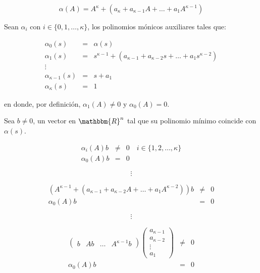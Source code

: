         \begin{equation}
            \alpha(A) = A^{\kappa} + (a_{\kappa} + a_{\kappa - 1} A + \dots + a_1 A^{\kappa - 1}) \nonumber
        \end{equation}

        Sean $\alpha_i$ con $i \in \{ 0, 1, \dots, \kappa \}$, los polinomios mónicos auxiliares tales que:

        \begin{eqnarray}
        \alpha_0(s) & = & \alpha(s) \nonumber \\
        \alpha_1(s) & = & s^{\kappa - 1} + (a_{\kappa - 1} + a_{\kappa - 2} s + \dots + a_1 s^{\kappa - 2}) \nonumber \\
        \vdots \nonumber \\
        \alpha_{\kappa - 1}(s) & = & s + a_1 \nonumber \\
        \alpha_{\kappa}(s) & = & 1 \nonumber
        \end{eqnarray}

        en donde, por definición, $\alpha_1(A) \ne 0$ y $\alpha_0(A) = 0$.

        Sea $b \ne 0$, un vector en $\mathbbm{R}^n$ tal que su polinomio mínimo coincide con $\alpha(s)$.

        \begin{eqnarray}
        \alpha_i(A) b & \ne & 0 \quad i \in \{ 1, 2, \dots, \kappa \} \nonumber \\
        \alpha_0(A) b & = & 0 \nonumber
        \end{eqnarray}

        \begin{equation}
            \vdots \nonumber
        \end{equation}

        \begin{eqnarray}
        (A^{\kappa - 1} + (a_{\kappa - 1} + a_{\kappa - 2} A + \dots + a_1 A^{\kappa - 2})) b & \ne & 0 \nonumber \\
        \alpha_0(A) b & = & 0 \nonumber
        \end{eqnarray}

        \begin{equation}
            \vdots \nonumber
        \end{equation}

        \begin{eqnarray}
        \begin{pmatrix}
        b & Ab & \dots & A^{\kappa - 1} b
        \end{pmatrix}
        \begin{pmatrix}
        a_{\kappa - 1} \\
        a_{\kappa - 2} \\
        \vdots \\
        a_{1}
        \end{pmatrix} & \ne & 0 \nonumber \\
        \alpha_0(A) b & = & 0 \nonumber
        \end{eqnarray}

